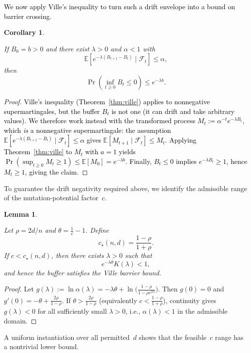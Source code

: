 \documentclass[lettersize,journal]{IEEEtran}
\newcommand{\new}[1]{\textcolor{black}{#1}}
\newcommand{\EE}{\mathbb{E}}
\newtheorem{corollary}{Corollary}
\newtheorem{lemma}{Lemma}
\begin{document}
{\new{We now apply Ville's inequality to turn such a drift envelope into a bound on barrier crossing.}


\begin{corollary}
\label{cor:ville-exponential}
	
	If $B_0=b>0$ and there exist $\lambda>0$ and $\alpha<1$ with
	\[
	\EE[e^{-\lambda(B_{t+1}-B_t)}\mid\mathcal{F}_t]\le\alpha,
	\]
	then
	\[
	\Pr\!\left(\inf_{t\ge0} B_t \le 0\right) \le e^{-\lambda b}.
	\]
\end{corollary}

\begin{proof}
	\textcolor{black}{Ville's inequality (Theorem~\ref{thm:ville}) applies to nonneg\-ative
	supermartingales, but the buffer $B_t$ is not one (it can drift and take
	arbitrary values).  We therefore work instead with the transformed process
	$M_t := \alpha^{-t}e^{-\lambda B_t}$, which \emph{is} a nonneg\-ative
	supermartingale: the assumption $\EE[e^{-\lambda(B_{t+1}-B_t)}\mid\mathcal F_t]
	\le \alpha$ gives $\EE[M_{t+1}\mid\mathcal F_t]\le M_t$.
	Applying Theorem~\ref{thm:ville} to $M_t$ with $a=1$ yields
	$\Pr(\sup_{t\ge 0} M_t\ge 1)\le \EE[M_0]=e^{-\lambda b}$.
	Finally, $B_t\le 0$ implies $e^{-\lambda B_t}\ge 1$, hence $M_t\ge 1$,
	giving the claim.}
	
\end{proof}


To guarantee the drift negativity required above, we identify the admissible 
range of the mutation-potential factor~$c$.

\begin{lemma}\label{lem:c-threshold-instance}
	
	Let $\rho=2d/n$ and $\theta=\frac{1}{c}-1$.  
	Define
	\[
	c_\star(n,d)=\frac{1-\rho}{1+\rho}.
	\]
	If $c<c_\star(n,d)$, then there exists $\lambda>0$ such that
	\[
	e^{-\lambda\theta}K(\lambda) < 1,
	\]
	and hence the buffer satisfies the Ville barrier bound.
\end{lemma}

\begin{proof}
	Let $g(\lambda):=\ln\alpha(\lambda)=-\lambda\theta+\ln\!\big(\tfrac{1-\rho}{1-\rho e^{2\lambda}}\big)$. 
	Then $g(0)=0$ and $g'(0)=-\theta+\tfrac{2\rho}{1-\rho}$. 
	If $\theta>\tfrac{2\rho}{1-\rho}$ (equivalently $c<\tfrac{1-\rho}{1+\rho}$), continuity gives $g(\lambda)<0$ for all sufficiently small $\lambda>0$, i.e., $\alpha(\lambda)<1$ in the admissible domain.
\end{proof}

A uniform instantiation over all permitted~$d$ shows that the feasible~$c$ 
range has a nontrivial lower bound.

}
\end{document}
